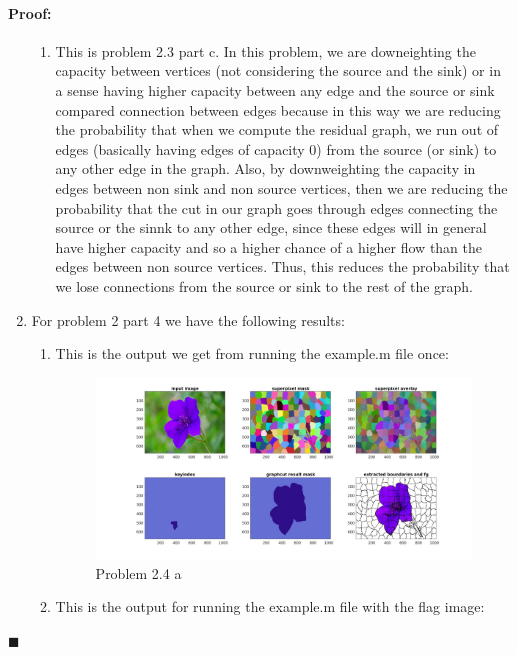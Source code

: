 \documentclass[12pt]{article}
\newenvironment{proof}{\paragraph{Proof: }}{\hfill$\blacksquare$}
\begin{document}
\begin{proof}
\begin{enumerate}
\begin{enumerate}
 \item This is problem 2.3 part c. In this problem, we are downeighting the capacity between vertices (not considering the source and the sink) or in a sense having higher capacity between any edge and the source or sink compared connection between edges because in this way we are reducing the probability that when we compute the residual graph, we run out of edges (basically having edges of capacity 0) from the source (or sink) to any other edge in the graph. Also, by downweighting the capacity in edges between non sink and non source vertices, then we are reducing the probability that the cut in our graph goes through edges connecting the source or the sinnk to any other edge, since these edges will in general have higher capacity and so a higher chance of a higher flow than the edges between non source vertices. Thus, this reduces the probability that we lose connections from the source or sink to the rest of the graph.

\end{enumerate}

\item For problem 2 part 4 we have the following results: 

\begin{enumerate}

\item This is the output we get from running the example.m file once:

\begin{figure}[!htbp]
\centering
\includegraphics[width=18cm]{problem2_4a.jpg}
\caption{Problem 2.4 a}
\end{figure}

\item This is the output for running the example.m file with the flag image:


\end{enumerate}
\end{enumerate}
\end{proof}
\end{document}
